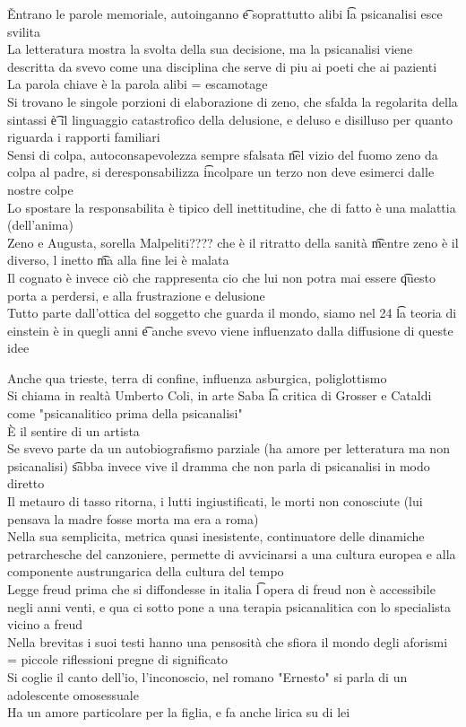 \documentclass[12pt]{article}
\begin{document}
\v

Entrano le parole memoriale, autoinganno \t e soprattutto alibi \t la psicanalisi esce svilita \\
La letteratura mostra la svolta della sua decisione, ma la psicanalisi viene descritta da svevo come una disciplina che serve di piu ai poeti che ai pazienti \\
La parola chiave è la parola alibi = escamotage \\
Si trovano le singole porzioni di elaborazione di zeno, che sfalda la regolarita della sintassi \t è il linguaggio catastrofico della delusione, e deluso e disilluso per quanto riguarda i rapporti familiari \\
Sensi di colpa, autoconsapevolezza sempre sfalsata \t nel vizio del fuomo zeno da colpa al padre, si deresponsabilizza \t incolpare un terzo non deve esimerci dalle nostre colpe \\
Lo spostare la responsabilita è tipico dell inettitudine, che di fatto è una malattia (dell'anima) \\
Zeno e Augusta, sorella Malpeliti???? che è il ritratto della sanità \t mentre zeno è il diverso, l inetto \t ma alla fine lei è malata \\
Il cognato è invece ciò che rappresenta cio che lui non potra mai essere \t questo porta a perdersi, e alla frustrazione e delusione \\
Tutto parte dall'ottica del soggetto che guarda il mondo, siamo nel 24 \t la teoria di einstein è in quegli anni \t e anche svevo viene influenzato dalla diffusione di queste idee

Anche qua trieste, terra di confine, influenza asburgica, poliglottismo \\
Si chiama in realtà Umberto Coli, in arte Saba \t la critica di Grosser e Cataldi come "psicanalitico prima della psicanalisi" \\
È il sentire di un artista \\
Se svevo parte da un autobiografismo parziale (ha amore per letteratura ma non psicanalisi) \t sabba invece vive il dramma che non parla di psicanalisi in modo diretto \\
Il metauro di tasso ritorna, i lutti ingiustificati, le morti non conosciute (lui pensava la madre fosse morta ma era a roma) \\
Nella sua semplicita, metrica quasi inesistente, continuatore delle dinamiche petrarchesche del canzoniere, permette di avvicinarsi a una cultura europea e alla componente austrungarica della cultura del tempo \\
Legge freud prima che si diffondesse in italia \t l opera di freud non è accessibile negli anni venti, e qua ci sotto pone a una terapia psicanalitica con lo specialista vicino a freud \\
Nella brevitas i suoi testi hanno una pensosità che sfiora il mondo degli aforismi = piccole riflessioni pregne di significato \\
Si coglie il canto dell'io, l'inconoscio, nel romano "Ernesto" si parla di un adolescente omosessuale \\
Ha un amore particolare per la figlia, e fa anche lirica su di lei
\end{document}
